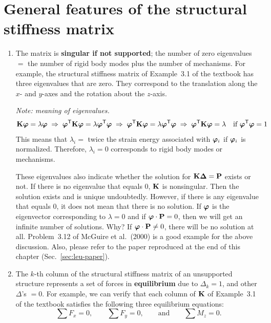\section{General features of the structural stiffness matrix}
\begin{enumerate}[leftmargin=*]
  \item The matrix is \textbf{singular if not supported}; the number of zero eigenvalues $=$ the number of rigid body modes plus the number of mechanisms. For example, the structural stiffness matrix of Example~3.1 of the textbook has three eigenvalues that are zero. They correspond to the translation along the $x$- and $y$-axes and the rotation about the $z$-axis.

    \emph{Note: meaning of eigenvalues.}
    \begin{equation}
      \mathbf{K}\bm{\varphi} = \lambda\bm{\varphi} \;\Rightarrow\; \bm{\varphi}^{\mathsf{T}}\mathbf{K}\bm{\varphi} = \lambda\bm{\varphi}^{\mathsf{T}}\bm{\varphi}
      \;\Rightarrow\; \bm{\varphi}^{\mathsf{T}}\mathbf{K}\bm{\varphi} = \lambda\bm{\varphi}^{\mathsf{T}}\bm{\varphi}
      \;\Rightarrow\; \bm{\varphi}^{\mathsf{T}}\mathbf{K}\bm{\varphi} = \lambda \quad\text{if } \bm{\varphi}^{\mathsf{T}}\bm{\varphi} = 1
    \end{equation}
    This means that $\lambda_i =$ twice the strain energy associated with $\bm{\varphi}_i$ if $\bm{\varphi}_i$ is normalized. Therefore, $\lambda_i = 0$ corresponds to rigid body modes or mechanisms.

    These eigenvalues also indicate whether the solution for $\mathbf{K}\bm{\Delta} = \mathbf{P}$ exists or not. If there is no eigenvalue that equals 0, $\mathbf{K}$ is nonsingular. Then the solution exists and is unique undoubtedly. However, if there is any eigenvalue that equals 0, it does not mean that there is no solution. If $\bm{\varphi}$ is the eigenvector corresponding to $\lambda = 0$ and if $\bm{\varphi}\cdot\mathbf{P} = 0$, then we will get an infinite number of solutions. Why? If $\bm{\varphi}\cdot\mathbf{P}\neq 0$, there will be no solution at all. Problem~3.12 of McGuire et al.\ (2000) is a good example for the above discussion. Also, please refer to the paper reproduced at the end of this chapter (Sec.~\ref{sec:leu-paper}).

  \item The $k$-th column of the structural stiffness matrix of an unsupported structure represents a set of forces in \textbf{equilibrium} due to $\Delta_k = 1$, and other $\Delta$'s $= 0$. For example, we can verify that each column of $\mathbf{K}$ of Example~3.1 of the textbook satisfies the following three equilibrium equations:
    \begin{equation*}
      \sum F_x = 0,\qquad \sum F_y = 0,\qquad\text{and}\qquad \sum M_z = 0.
    \end{equation*}


\end{enumerate}
